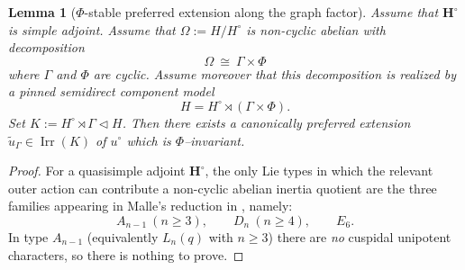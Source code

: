 \documentclass{amsart}
\theoremstyle{plain}
\numberwithin{equation}{section}
\newtheorem{lemma}[theorem]{Lemma}
\theoremstyle{definition}
\newcommand{\Irr}{\operatorname{Irr}}
\newcommand{\bH}{\mathbf{H}}
\begin{document}
\begin{lemma}[\(\Phi\)-stable preferred extension along the graph factor]
\label{lem:preferred-extension-cuspidal-abelian}
Assume that \(\bH^\circ\) is simple adjoint. Assume that
\(\Omega:= H/H^\circ\) is non-cyclic abelian with decomposition
\[
\Omega \ \cong\ \Gamma \times \Phi
\]
where \(\Gamma\) and \(\Phi\) are cyclic.  Assume moreover that this decomposition is realized by a
pinned semidirect component model
\[
        H=H^\circ\rtimes (\Gamma\times\Phi).
\]
Set $K:=H^\circ\rtimes\Gamma\lhd H$.  Then there exists a canonically preferred extension $\tilde u_\Gamma\in\Irr(K)$ of $u^\circ$ which is $\Phi$--invariant.
\end{lemma}

\begin{proof}
For a quasisimple adjoint $\mathbf H^\circ$, the only Lie types in which the relevant
outer action can contribute a non-cyclic abelian inertia quotient are the three families
appearing in Malle's reduction in \cite[Prop.~2.2]{Malle08}, namely:
\[
A_{n-1}\ (n\ge3),\qquad D_n\ (n\ge4),\qquad E_6.
\]
In type $A_{n-1}$ (equivalently $L_n(q)$ with $n\ge3$) there are \emph{no} cuspidal unipotent
characters, so there is nothing to prove.


\end{proof}
\end{document}
